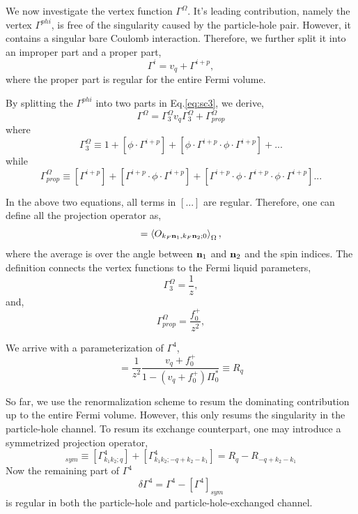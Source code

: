 \documentclass[reprint,amsmath,amssymb,aps,prb]{revtex4-1}
\begin{document}
We now investigate the vertex function $\Gamma^\Omega$. It's leading contribution, namely
the vertex $\Gamma^{phi}$, is free of the singularity caused by the particle-hole pair. However, it contains
a singular bare Coulomb interaction. Therefore, we further split it into an improper part and a proper part,
\begin{equation}
    \Gamma^{i}=v_q+\Gamma^{i+p},
\end{equation}
where the proper part is regular for the entire Fermi volume.

By splitting the $\Gamma^{phi}$ into two parts in Eq.\eqref{eq:sc3}, we derive,
\begin{equation}
    \Gamma^{\Omega} = \Gamma_3^{\Omega}v_q \Gamma_3^{\Omega}+\Gamma_{prop}^{\Omega}
\end{equation}
where
\begin{equation}
    \Gamma_3^\Omega \equiv 1+[\phi\cdot \Gamma^{i+p}]+[\phi \cdot \Gamma^{i+p} \cdot \phi \cdot \Gamma^{i+p}]+...
\end{equation}
while
\begin{equation}
    \Gamma^\Omega_{prop} \equiv [\Gamma^{i+p}]+[\Gamma^{i+p}\cdot \phi \cdot \Gamma^{i+p}]+[\Gamma^{i+p}\cdot \phi \cdot \Gamma^{i+p}\cdot \phi \cdot \Gamma^{i+p}]...
\end{equation}

In the above two equations, all terms in $[...]$ are regular. Therefore, one can define all the projection operator as,
\begin{equation}
    [O_{k_1k_2;q}] =\left<O_{k_F{\bf{n}}_1, k_F{\bf{n}}_2; 0}\right>_\Omega,
\end{equation}
where the average is over the angle between ${\bf{n}}_1$ and ${\bf{n}}_2$ and the spin indices.
The definition connects the vertex functions to the Fermi liquid parameters,
\begin{equation}
    \Gamma_3^\Omega = \frac{1}{z},
\end{equation}
and,
\begin{equation}
    \Gamma_{prop}^\Omega = \frac{f_0^+}{z^2},
\end{equation}

We arrive with a parameterization of $\Gamma^4$,
\begin{equation}
    [\Gamma^4]=\frac{1}{z^2}\frac{v_q+f_0^+}{1-(v_q+f_0^+)\Pi_0^*}\equiv R_q
\end{equation}

So far, we use the renormalization scheme to resum the dominating contribution up to the entire Fermi volume.
However, this only resums the singularity in the particle-hole channel. To resum its exchange counterpart,
one may introduce a symmetrized projection operator,
\begin{equation}
    [\Gamma^4]_{sym} \equiv [\Gamma^4_{k_1k_2; q}]+[\Gamma^4_{k_1k_2; -q+k_2-k_1}]=R_q-R_{-q+k_2-k_1}
\end{equation}
Now the remaining part of $\Gamma^4$
\begin{equation}
    \delta \Gamma^4 = \Gamma^4-[\Gamma^4]_{sym}
\end{equation}
is regular in both the particle-hole and particle-hole-exchanged channel.
\end{document}
